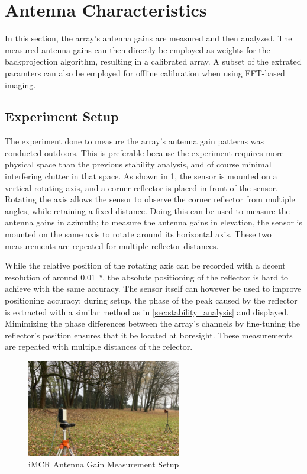 \section{Antenna Characteristics}
\label{sec:calibration}

In this section, the array's antenna gains are measured and then analyzed.
The measured antenna gains can then directly be employed as weights for the backprojection algorithm,
resulting in a calibrated array.
A subset of the extrated paramters can also be employed for offline calibration when using FFT-based imaging.


\subsection{Experiment Setup}
The experiment done to measure the array's antenna gain patterns was conducted outdoors.
This is preferable because the experiment requires more physical space than the previous stability analysis,
and of course minimal interfering clutter in that space.
As shown in \cref{fig:setup_rotating}, the sensor is mounted on a vertical rotating axis,
and a corner reflector is placed in front of the sensor.
Rotating the axis allows the sensor to observe the corner reflector from multiple angles, while retaining a fixed distance.
Doing this can be used to measure the antenna gains in azimuth;
to measure the antenna gains in elevation, the sensor is mounted on the same axis to rotate around its horizontal axis.
These two measurements are repeated for multiple reflector distances.

While the relative position of the rotating axis can be recorded with a decent resolution of around \SI{0.01}{\degree},
the absolute positioning of the reflector is hard to achieve with the same accuracy.
The sensor itself can however be used to improve positioning accuracy:
during setup, the phase of the peak caused by the reflector
is extracted with a similar method as in \cref{sec:stability_analysis} and displayed.
Mimimizing the phase differences between the array's channels by fine-tuning the reflector's position
ensures that it be located at boresight.
These measurements are repeated with multiple distances of the relector.\\
\begin{figure}[h]
  \centering
  \includegraphics[width=0.6\textwidth]{../figures/setup_rotating.jpg}
  \caption{iMCR Antenna Gain Measurement Setup}
  \label{fig:setup_rotating}
\end{figure}

